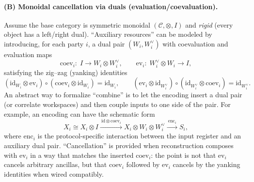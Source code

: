 \documentclass[11pt,a4paper]{article}
\theoremstyle{definition}
\theoremstyle{plain}
\begin{document}
\paragraph{(B) Monoidal cancellation via duals (evaluation/coevaluation).}
Assume the base category is symmetric monoidal $(\mathcal{C},\otimes,I)$ and \emph{rigid} (every object has a left/right dual).
``Auxiliary resources'' can be modeled by introducing, for each party $i$, a dual pair $(W_i,W_i^\vee)$ with coevaluation and evaluation maps
\[
\mathrm{coev}_i:\; I \longrightarrow W_i\otimes W_i^\vee,
\qquad
\mathrm{ev}_i:\; W_i^\vee\otimes W_i \longrightarrow I,
\]
satisfying the zig--zag (yanking) identities
\[
(\mathrm{id}_{W_i}\otimes \mathrm{ev}_i)\circ (\mathrm{coev}_i\otimes \mathrm{id}_{W_i})=\mathrm{id}_{W_i},
\qquad
(\mathrm{ev}_i\otimes \mathrm{id}_{W_i^\vee})\circ (\mathrm{id}_{W_i^\vee}\otimes \mathrm{coev}_i)=\mathrm{id}_{W_i^\vee}.
\]
An abstract way to formalize ``combine'' is to let the encoding insert a dual pair (or correlate workspaces) and then couple inputs to one side of the pair.
For example, an encoding can have the schematic form
\[
X_i \cong X_i\otimes I
\xrightarrow{\ \mathrm{id}\otimes \mathrm{coev}_i\ }
X_i\otimes W_i\otimes W_i^\vee
\xrightarrow{\ \mathrm{enc}_i\ }
S_i,
\]
where $\mathrm{enc}_i$ is the protocol-specific interaction between the input register and an auxiliary dual pair.
``Cancellation'' is provided when reconstruction composes with $\mathrm{ev}_i$ in a way that matches the inserted $\mathrm{coev}_i$:
the point is not that $\mathrm{ev}_i$ cancels arbitrary ancillas, but that $\mathrm{coev}_i$ followed by $\mathrm{ev}_i$ cancels by the yanking identities when wired compatibly.
\end{document}
